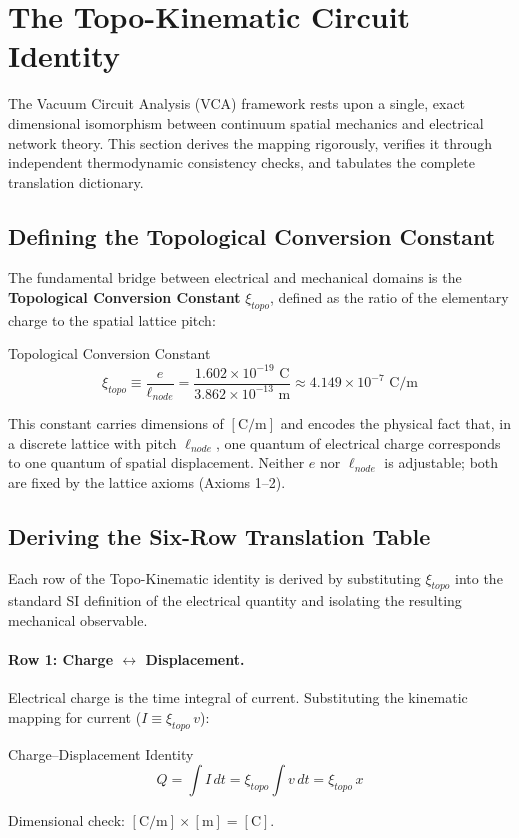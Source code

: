 \section{The Topo-Kinematic Circuit Identity}
\label{sec:topo_kinematic}

The Vacuum Circuit Analysis (VCA) framework rests upon a single, exact dimensional isomorphism between continuum spatial mechanics and electrical network theory. This section derives the mapping rigorously, verifies it through independent thermodynamic consistency checks, and tabulates the complete translation dictionary.

\subsection{Defining the Topological Conversion Constant}

The fundamental bridge between electrical and mechanical domains is the \textbf{Topological Conversion Constant} $\xi_{topo}$, defined as the ratio of the elementary charge to the spatial lattice pitch:
\begin{resultbox}{Topological Conversion Constant}
\begin{equation}
    \xi_{topo} \equiv \frac{e}{\ell_{node}} = \frac{1.602 \times 10^{-19} \text{ C}}{3.862 \times 10^{-13} \text{ m}} \approx 4.149 \times 10^{-7} \text{ C/m}
    \label{eq:xi_topo_vca}
\end{equation}
\end{resultbox}

This constant carries dimensions of $[\text{C/m}]$ and encodes the physical fact that, in a discrete lattice with pitch $\ell_{node}$, one quantum of electrical charge corresponds to one quantum of spatial displacement. Neither $e$ nor $\ell_{node}$ is adjustable; both are fixed by the lattice axioms (Axioms 1--2).

\subsection{Deriving the Six-Row Translation Table}

Each row of the Topo-Kinematic identity is derived by substituting $\xi_{topo}$ into the standard SI definition of the electrical quantity and isolating the resulting mechanical observable.

\paragraph{Row 1: Charge $\leftrightarrow$ Displacement.}
Electrical charge is the time integral of current. Substituting the kinematic mapping for current ($I \equiv \xi_{topo}\, v$):
\begin{resultbox}{Charge--Displacement Identity}
\begin{equation}
    Q = \int I \, dt = \xi_{topo} \int v \, dt = \xi_{topo}\, x
    \label{eq:charge_displacement}
\end{equation}
\end{resultbox}
\noindent Dimensional check: $[\text{C/m}] \times [\text{m}] = [\text{C}]$. \checkmark

